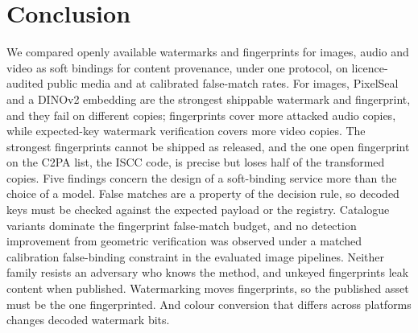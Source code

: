 \section{Conclusion}
\label{sec:conclusion}
We compared openly available watermarks and fingerprints for images, audio and video as soft bindings for content provenance, under one protocol, on licence-audited public media and at calibrated false-match rates. For images, PixelSeal and a DINOv2 embedding are the strongest shippable watermark and fingerprint, and they fail on different copies; fingerprints cover more attacked audio copies, while expected-key watermark verification covers more video copies. The strongest fingerprints cannot be shipped as released, and the one open fingerprint on the C2PA list, the ISCC code, is precise but loses half of the transformed copies. Five findings concern the design of a soft-binding service more than the choice of a model. False matches are a property of the decision rule, so decoded keys must be checked against the expected payload or the registry. Catalogue variants dominate the fingerprint false-match budget, and no detection improvement from geometric verification was observed under a matched calibration false-binding constraint in the evaluated image pipelines. Neither family resists an adversary who knows the method, and unkeyed fingerprints leak content when published. Watermarking moves fingerprints, so the published asset must be the one fingerprinted. And colour conversion that differs across platforms changes decoded watermark bits.
